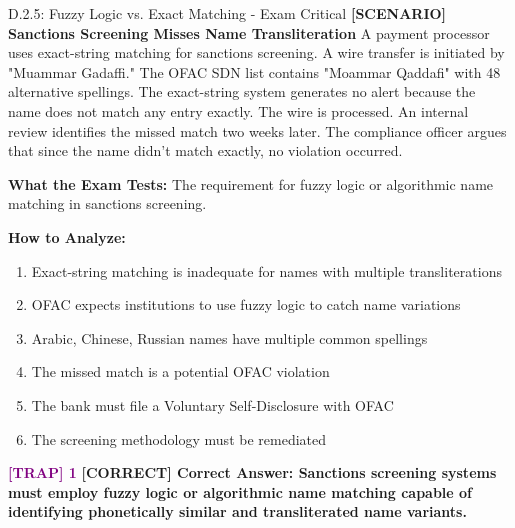 \documentclass[11pt,a4paper]{beamer}
\newcommand{\trap}[1]{\textcolor{purple}{\textbf{[TRAP] 1}}}
\newcommand{\correct}[1]{\textcolor{green!50!black}{\textbf{[CORRECT] #1}}}
\newcommand{\scenario}[1]{\textcolor{blue!70!black}{\textbf{[SCENARIO] #1}}}
\begin{document}
\begin{frame}{D.2.5: Fuzzy Logic vs. Exact Matching - Exam Critical}
	\scenario{Sanctions Screening Misses Name Transliteration}
	A payment processor uses exact-string matching for sanctions screening. A wire transfer is initiated by "Muammar Gadaffi." The OFAC SDN list contains "Moammar Qaddafi" with 48 alternative spellings. The exact-string system generates no alert because the name does not match any entry exactly. The wire is processed. An internal review identifies the missed match two weeks later. The compliance officer argues that since the name didn't match exactly, no violation occurred.
	
	\vspace{0.1cm}
	\textbf{What the Exam Tests:} The requirement for fuzzy logic or algorithmic name matching in sanctions screening.
	
	\vspace{0.1cm}
	\textbf{How to Analyze:}
	\begin{enumerate}
		\item Exact-string matching is inadequate for names with multiple transliterations
		\item OFAC expects institutions to use fuzzy logic to catch name variations
		\item Arabic, Chinese, Russian names have multiple common spellings
		\item The missed match is a potential OFAC violation
		\item The bank must file a Voluntary Self-Disclosure with OFAC
		\item The screening methodology must be remediated
	\end{enumerate}
	
	\trap{Common Distractor: "Exact-string matching is a legally defensible standard under BSA regulations."}
	\correct{Correct Answer: Sanctions screening systems must employ fuzzy logic or algorithmic name matching capable of identifying phonetically similar and transliterated name variants.}
\end{frame}
\end{document}
